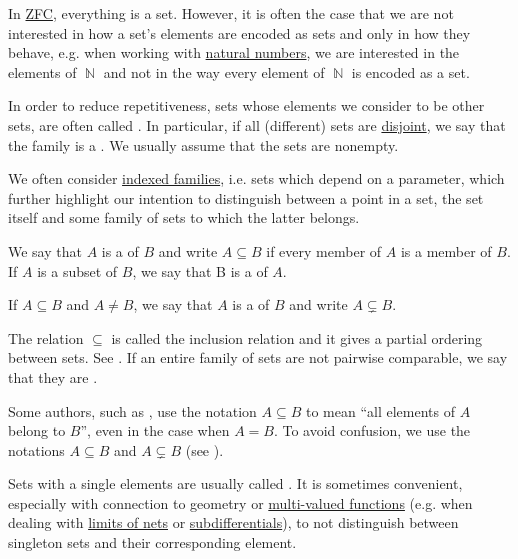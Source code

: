 \begin{remark}\label{rem:family_of_sets}
  In \hyperref[def:zfc]{ZFC}, everything is a set. However, it is often the case that we are not interested in how a set's elements are encoded as sets and only in how they behave, e.g. when working with \hyperref[def:set_of_natural_numbers]{natural numbers}, we are interested in the elements of \( \BbbN \) and not in the way every element of \( \BbbN \) is encoded as a set.

  In order to reduce repetitiveness, sets whose elements we consider to be other sets, are often called . In particular, if all (different) sets are \hyperref[def:subset]{disjoint}, we say that the family is a . We usually assume that the sets are nonempty.

  We often consider \hyperref[def:indexed_family]{indexed families}, i.e. sets which depend on a parameter, which further highlight our intention to distinguish between a point in a set, the set itself and some family of sets to which the latter belongs.
\end{remark}

\begin{definition}\label{def:subset}
  We say that \( A \) is a  of \( B \) and write \( A \subseteq B \) if every member of \( A \) is a member of \( B \). If \( A \) is a subset of \( B \), we say that B is a  of \( A \).

  If \( A \subseteq B \) and \( A \neq B \), we say that \( A \) is a  of \( B \) and write \( A \subsetneq B \).

  The relation \( \subseteq \) is called the inclusion relation and it gives a partial ordering between sets. See . If an entire family of sets are not pairwise comparable, we say that they are .
\end{definition}

\begin{remark}\label{rem:subset_notation}
  Some authors, such as \cite{Kelley1955}, use the notation \( A \subseteq B \) to mean \enquote{all elements of \( A \) belong to \( B \)}, even in the case when \( A = B \). To avoid confusion, we use the notations \( A \subseteq B \) and \( A \subsetneq B \) (see ).
\end{remark}

\begin{remark}\label{rem:singleton_sets}
  Sets with a single elements are usually called . It is sometimes convenient, especially with connection to geometry or \hyperref[def:function/multi-valued]{multi-valued functions} (e.g. when dealing with \hyperref[def:net_convergence/limit]{limits of nets} or \hyperref[def:subdifferentials]{subdifferentials}), to not distinguish between singleton sets and their corresponding element.
\end{remark}

